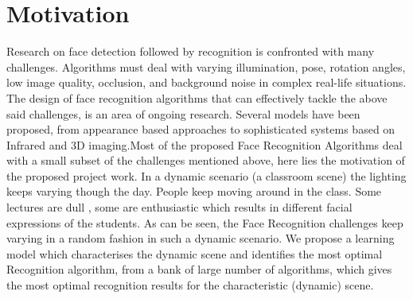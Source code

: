 \section*{Motivation}

Research on face detection followed by recognition is confronted with many challenges. Algorithms must deal with varying illumination, pose, rotation angles, low image quality, occlusion, and background noise in complex real-life situations. The design of face recognition algorithms that can effectively tackle the above said challenges, is an area of ongoing research. Several models have been proposed, from appearance based approaches to sophisticated systems based on Infrared and 3D imaging.Most of the proposed Face Recognition Algorithms deal with a small subset of the challenges mentioned above, here lies the motivation of the proposed project work. In a dynamic scenario (a classroom scene) the lighting keeps varying though the day. People keep moving around in the class. Some lectures are dull , some are enthusiastic which results in different facial expressions of the students. As can be seen, the Face Recognition challenges keep varying in a random fashion in such a dynamic scenario. We propose a learning model which characterises the dynamic scene and identifies the most optimal Recognition algorithm, from a bank of large number of algorithms, which gives the most optimal recognition results for the characteristic (dynamic) scene.
